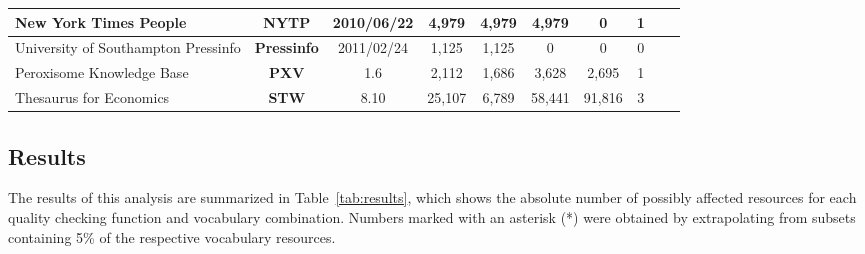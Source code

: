 \begin{table}
\begin{center}
{\begin{tabular}{p{6cm}ccccccccc}
\hline
New York Times People & \textbf{NYTP} & 2010/06/22 & 4,979 & 4,979 & 4,979 & 0 & 1 \\
\hline
University of Southampton Pressinfo & \textbf{Pressinfo} & 2011/02/24 & 1,125 & 1,125 & 0 & 0 & 0 \\
\hline
Peroxisome Knowledge Base & \textbf{PXV} & 1.6 & 2,112 & 1,686 & 3,628 & 2,695 & 1 \\
\hline
Thesaurus for Economics & \textbf{STW} & 8.10 & 25,107 & 6,789 & 58,441 & 91,816 & 3 \\
\bottomrule
\end{tabular}
}
\end{center}
\end{table}

\subsection{Results}

The results of this analysis are summarized in Table~\ref{tab:results}, which shows the absolute number of possibly affected resources for each quality checking function and vocabulary combination. Numbers marked with an asterisk (*) were obtained by extrapolating from subsets containing 5\% of the respective vocabulary resources.

